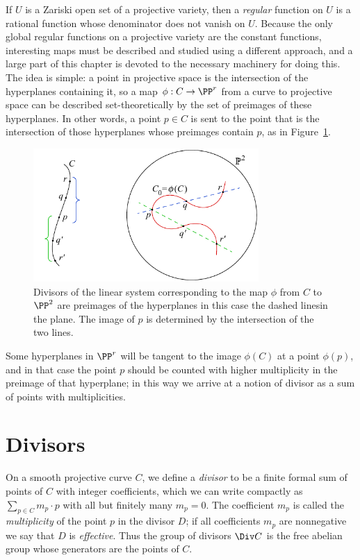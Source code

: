 If $U$ is a Zariski open set of a projective variety, then a \emph{regular} function on $U$
is a rational function whose denominator does not vanish on $U$.
Because the only global regular functions on a projective variety are the  constant functions, 
interesting maps must be described and studied using
a different approach, and a large part of this chapter is devoted to the necessary machinery for doing this. The idea is simple: a point in projective space is the intersection of the hyperplanes containing it, so a map $\phi: C\to \PP^r$ from a curve to projective space can be described set-theoretically
by the set of preimages of these hyperplanes. 
In other words, a point $p\in C$ is sent to the point
that is the intersection of those hyperplanes whose preimages contain $p$, as in Figure~\ref{set-theoretic map}.
 
\begin{figure}[b]\label{set-theoretic map}
\centerline {\includegraphics[height=2in]{"main/Fig01-1"}}
 \caption{Divisors of the linear system corresponding to the map
   $\phi$ from $C$ 
to $\PP^2$ are preimages of the hyperplanes\emdash
   in this case the dashed lines\emdash in the plane.
 The image of $p$ is determined by the intersection of the two lines.
}
\end{figure}


Some hyperplanes in $\PP^{r}$ will be tangent to the image $\phi(C)$ at a point $\phi(p)$, and in that case the point $p$ should be counted with higher multiplicity in the preimage of that hyperplane; in
this way we arrive at a notion of divisor as a sum of points with multiplicities.

\section{Divisors}

On a smooth projective curve $C$, we define a \emph{divisor} to be a
finite formal sum of points of $C$ with integer coefficients, which we
can write compactly as $\sum_{p\in C} m_p\cdot p$ with all but
finitely many $m_p=0$.  The coefficient $m_p$ is called the
\emph{multiplicity} of the point $p$ in the divisor $D$; if all
coefficients $m_p$ are nonnegative we say that $D$ is
\emph{effective}. Thus the group of divisors $\Div C$ is the free
abelian group whose generators
%
%
%
are the points of $C$.


